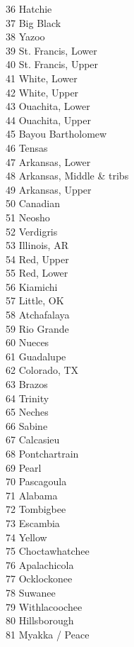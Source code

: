 \documentclass[11pt]{article}
\begin{document}
\begin{multicols}{3}
36 Hatchie\\
37 Big Black\\
38 Yazoo\\
39 St. Francis, Lower\\
40 St. Francis, Upper\\
41 White, Lower\\
42 White, Upper\\
43 Ouachita, Lower\\
44 Ouachita, Upper\\
45 Bayou Bartholomew\\
46 Tensas\\
47 Arkansas, Lower\\
48 Arkansas, Middle \& tribs\\
49 Arkansas, Upper\\
50 Canadian\\
51 Neosho\\
52 Verdigris\\
53 Illinois, AR\\
54 Red, Upper\\
55 Red, Lower\\
56 Kiamichi\\
57 Little, OK\\
58 Atchafalaya\\
59 Rio Grande\\
60 Nueces\\
61 Guadalupe\\
62 Colorado, TX\\
63 Brazos\\
64 Trinity\\
65 Neches\\
66 Sabine\\
67 Calcasieu\\
68 Pontchartrain\\
69 Pearl\\
70 Pascagoula\\
71 Alabama\\
72 Tombigbee\\
73 Escambia\\
74 Yellow\\
75 Choctawhatchee\\
76 Apalachicola\\
77 Ocklockonee\\
78 Suwanee\\
79 Withlacoochee\\
80 Hillsborough\\
81 Myakka / Peace\\

\end{multicols}
\end{document}
